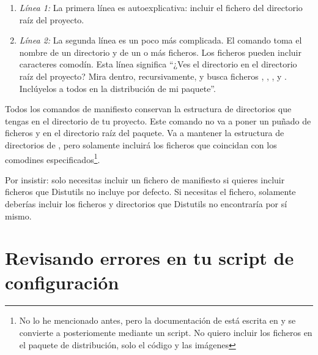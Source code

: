 {\begin{enumerate}
  \item \emph{Línea 1:} La primera línea es autoexplicativa: incluir el fichero  del directorio raíz del proyecto.
  \item \emph{Línea 2:} La segunda línea es un poco más complicada. El comando  toma el nombre de un directorio y de un o más ficheros. Los ficheros pueden incluir caracteres comodín. Esta línea significa ``¿Ves el directorio  en el directorio raíz del proyecto? Mira dentro, recursivamente, y busca ficheros , , , y . Inclúyelos a todos en la distribución de mi paquete''.
\end{enumerate}

Todos los comandos de manifiesto conservan la estructura de directorios que tengas en el directorio de tu proyecto. Este comando  no va a poner un puñado de ficheros  y  en el directorio raíz del paquete. Va a mantener la estructura de directorios de , pero solamente incluirá los ficheros que coincidan con los comodines especificados\footnote{No lo he mencionado antes, pero la documentación de  está escrita en  y se convierte a  posteriomente mediante un script. No quiero incluir los ficheros  en el paquete de distribución, solo el código  y las imágenes}.


Por insistir: solo necesitas incluir un fichero de manifiesto si quieres incluir ficheros que Distutils no incluye por defecto. Si necesitas el fichero, solamente deberías incluir los ficheros y directorios que Distutils no encontraría por sí mismo.

\section{Revisando errores en tu script de configuración}

}
